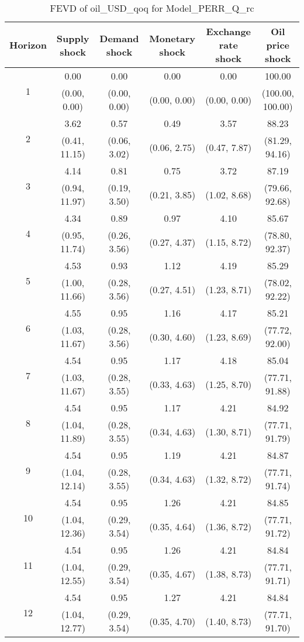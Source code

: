 \documentclass{article}
\begin{document}
\begin{table}
	\footnotesize
	\caption{FEVD of oil_USD_qoq for Model_PERR_Q_rc}
	\begin{tabular}{cccccc}
		Horizon & Supply shock & Demand shock & Monetary shock & Exchange rate shock & Oil price shock\\ \hline
		\multirow{2}{*}{1} & 0.00 & 0.00 & 0.00 & 0.00 & 100.00\\
		 & (0.00, 0.00) & (0.00, 0.00) & (0.00, 0.00) & (0.00, 0.00) & (100.00, 100.00)\\
		\multirow{2}{*}{2} & 3.62 & 0.57 & 0.49 & 3.57 & 88.23\\
		 & (0.41, 11.15) & (0.06, 3.02) & (0.06, 2.75) & (0.47, 7.87) & (81.29, 94.16)\\
		\multirow{2}{*}{3} & 4.14 & 0.81 & 0.75 & 3.72 & 87.19\\
		 & (0.94, 11.97) & (0.19, 3.50) & (0.21, 3.85) & (1.02, 8.68) & (79.66, 92.68)\\
		\multirow{2}{*}{4} & 4.34 & 0.89 & 0.97 & 4.10 & 85.67\\
		 & (0.95, 11.74) & (0.26, 3.56) & (0.27, 4.37) & (1.15, 8.72) & (78.80, 92.37)\\
		\multirow{2}{*}{5} & 4.53 & 0.93 & 1.12 & 4.19 & 85.29\\
		 & (1.00, 11.66) & (0.28, 3.56) & (0.27, 4.51) & (1.23, 8.71) & (78.02, 92.22)\\
		\multirow{2}{*}{6} & 4.55 & 0.95 & 1.16 & 4.17 & 85.21\\
		 & (1.03, 11.67) & (0.28, 3.56) & (0.30, 4.60) & (1.23, 8.69) & (77.72, 92.00)\\
		\multirow{2}{*}{7} & 4.54 & 0.95 & 1.17 & 4.18 & 85.04\\
		 & (1.03, 11.67) & (0.28, 3.55) & (0.33, 4.63) & (1.25, 8.70) & (77.71, 91.88)\\
		\multirow{2}{*}{8} & 4.54 & 0.95 & 1.17 & 4.21 & 84.92\\
		 & (1.04, 11.89) & (0.28, 3.55) & (0.34, 4.63) & (1.30, 8.71) & (77.71, 91.79)\\
		\multirow{2}{*}{9} & 4.54 & 0.95 & 1.19 & 4.21 & 84.87\\
		 & (1.04, 12.14) & (0.28, 3.55) & (0.34, 4.63) & (1.32, 8.72) & (77.71, 91.74)\\
		\multirow{2}{*}{10} & 4.54 & 0.95 & 1.26 & 4.21 & 84.85\\
		 & (1.04, 12.36) & (0.29, 3.54) & (0.35, 4.64) & (1.36, 8.72) & (77.71, 91.72)\\
		\multirow{2}{*}{11} & 4.54 & 0.95 & 1.26 & 4.21 & 84.84\\
		 & (1.04, 12.55) & (0.29, 3.54) & (0.35, 4.67) & (1.38, 8.73) & (77.71, 91.71)\\
		\multirow{2}{*}{12} & 4.54 & 0.95 & 1.27 & 4.21 & 84.84\\
		 & (1.04, 12.77) & (0.29, 3.54) & (0.35, 4.70) & (1.40, 8.73) & (77.71, 91.70)\\
	\end{tabular}
\label{tab:fevd-Model_PERR_Q_rc-oil_USD_qoq}
\end{table}
\end{document}
